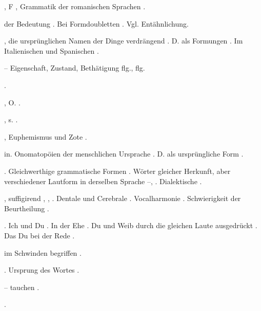\begin{register}

, F , Grammatik der romanischen Sprachen \pageref{sp.173}.

 der Bedeutung \pageref{sp.100}. Bei Formdoubletten \pageref{sp.254}. Vgl. Entähnlichung.

, die ursprünglichen Namen der Dinge verdrängend \pageref{sp.242}. D. als Formungen \pageref{sp.324}. Im Italienischen und Spanischen \pageref{sp.445}.

 – Eigenschaft, Zustand, Bethätigung \pageref{sp.381} flg., \pageref{sp.453} flg.

 \pageref{sp.282}.

, O. \pageref{sp.294}.

, s. .

, Euphemismus und Zote \pageref{sp.248}.

 in. Onomatopöien der menschlichen Ursprache \pageref{sp.255}\sed{, \pageref{sp.314}}. D. als ursprüngliche Form \pageref{sp.326}.

.  Gleichwerthige grammatische Formen \pageref{sp.254}. Wörter gleicher Herkunft, aber verschiedener Lautform in derselben Sprache \pageref{sp.266}–\pageref{sp.267}, \pageref{sp.276}. Dialektische \pageref{sp.285}.

, suffigirend \inlineupdate{\pageref{sp.29};}{\pageref{sp.29},} \pageref{sp.142}, \pageref{sp.149}, \pageref{sp.349}. Dentale und Cerebrale \pageref{sp.269}.  Vocalharmonie \pageref{sp.402}. Schwierigkeit der Beurtheilung \sed{\pageref{sp.281},} \pageref{sp.426}.

. Ich und Du \pageref{sp.2}. In der Ehe \pageref{sp.306}. Du und Weib durch die gleichen Laute ausgedrückt \pageref{sp.306}. Das Du bei der Rede \pageref{sp.318}.

 im Schwinden begriffen \pageref{sp.254}\sed{, \pageref{sp.393}}.

. Ursprung des Wortes \pageref{sp.41}.


 – tauchen \pageref{sp.267}.

 \pageref{sp.165}.


\end{register}
